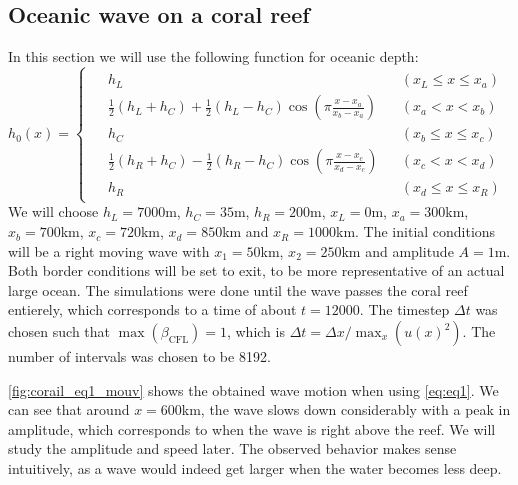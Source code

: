 
\subsection{Oceanic wave on a coral reef}

In this section we will use the following function for oceanic depth:
\begin{equation}
    h_0(x) = \begin{cases}
        \begin{aligned}
            &\scriptstyle{h_L} &&\scriptstyle{(x_L \le x \le x_a)} \\
            &\scriptstyle{\frac{1}{2}(h_L + h_C) + \frac{1}{2}(h_L - h_C) \cos \left( \pi \frac{x-x_a}{x_b-x_a} \right)} &&\scriptstyle{(x_a < x < x_b)} \\
            &\scriptstyle{h_C} &&\scriptstyle{(x_b \le x \le x_c)} \\
            &\scriptstyle{\frac{1}{2}(h_R + h_C) - \frac{1}{2}(h_R - h_C) \cos \left( \pi \frac{x-x_c}{x_d-x_c} \right)} &&\scriptstyle{(x_c < x < x_d)} \\
            &\scriptstyle{h_R} &&\scriptstyle{(x_d \le x \le x_R)}
        \end{aligned}
    \end{cases}
\end{equation}
We will choose \(h_L = 7000\)m, \(h_C = 35\)m, \(h_R = 200\)m, \(x_L = 0\)m, \(x_a = 300\)km, \(x_b = 700\)km, \(x_c = 720\)km, \(x_d = 850\)km and \(x_R = 1000\)km. The initial conditions will be a right moving wave with \(x_1 = 50\)km, \(x_2 = 250\)km and amplitude \(A = 1\)m. Both border conditions will be set to exit, to be more representative of an actual large ocean. The simulations were done until the wave passes the coral reef entierely, which corresponds to a time of about \(t = 12000\). The timestep \(\Delta t\) was chosen such that \(\max(\beta_{\textrm{CFL}}) = 1\), which is \(\Delta t = \Delta x / \max_x(u(x)^2)\). The number of intervals was chosen to be 8192.

\autoref{fig:corail_eq1_mouv} shows the obtained wave motion when using \autoref{eq:eq1}. We can see that around \(x=600\)km, the wave slows down considerably with a peak in amplitude, which corresponds to when the wave is right above the reef. We will study the amplitude and speed later. The observed behavior makes sense intuitively, as a wave would indeed get larger when the water becomes less deep.

